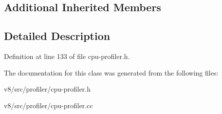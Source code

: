 \subsection*{Additional Inherited Members}


\subsection{Detailed Description}


Definition at line 133 of file cpu-\/profiler.\+h.



The documentation for this class was generated from the following files\+:\begin{DoxyCompactItemize}
\item 
v8/src/profiler/cpu-\/profiler.\+h\item 
v8/src/profiler/cpu-\/profiler.\+cc\end{DoxyCompactItemize}
